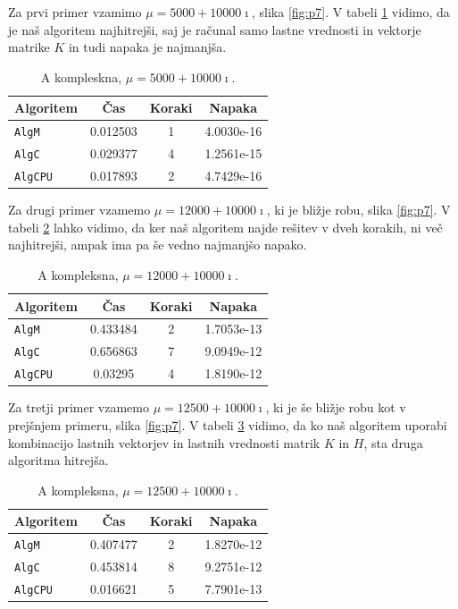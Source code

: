 \documentclass[12pt,a4paper]{amsart}
\theoremstyle{definition}
\theoremstyle{plain}
\begin{document}
Za prvi primer vzamimo $\mu = 5000+10000\imath$, slika \ref{fig:p7}. V tabeli \ref{t7} vidimo, da je naš algoritem najhitrejši, saj je računal samo lastne vrednosti in vektorje matrike $K$ in tudi napaka je najmanjša.


\begin{table}[H]
\caption{A kompleskna, $\mu = 5000+10000\imath$.}
\begin{tabular}{|l|c|c|c|}
\hline
Algoritem & Čas & Koraki & Napaka\\
\hline
\hline
\verb+AlgM+ &0.012503&1&4.0030e-16\\
\hline
\verb+AlgC+ &0.029377&4& 1.2561e-15\\
\hline
\verb+AlgCPU+ &0.017893&2&4.7429e-16\\
\hline
\end{tabular}

\label{t7}
\end{table}

Za drugi primer vzamemo $\mu = 12000+10000\imath$, ki je bližje robu, slika \ref{fig:p7}. V tabeli \ref{t8} lahko vidimo, da ker naš algoritem najde rešitev v dveh korakih, ni več najhitrejši, ampak ima pa še vedno najmanjšo napako.

\begin{table}[H]
\caption{A kompleksna, $\mu = 12000+10000\imath$.}
\begin{tabular}{|l|c|c|c|}
\hline
Algoritem & Čas & Koraki & Napaka\\
\hline
\hline
\verb+AlgM+& 0.433484&2 &1.7053e-13 \\
\hline
\verb+AlgC+ &0.656863&7&9.0949e-12\\
\hline
\verb+AlgCPU+ &0.03295&4&1.8190e-12\\
\hline
\end{tabular}

\label{t8}
\end{table}

Za tretji primer vzamemo $\mu = 12500+10000\imath$, ki je še bližje robu kot v prejšnjem primeru, slika \ref{fig:p7}. V tabeli \ref{t9} vidimo, da ko naš algoritem uporabi kombinacijo lastnih vektorjev in lastnih vrednosti matrik $K$ in $H$, sta druga algoritma hitrejša.


\begin{table}[H]
\caption{A kompleksna, $\mu = 12500+10000\imath$.}
\begin{tabular}{|l|c|c|c|}
\hline
Algoritem & Čas & Koraki & Napaka\\
\hline
\hline
\verb+AlgM+ &0.407477&2&1.8270e-12\\
\hline
\verb+AlgC+ &0.453814 &8 & 9.2751e-12\\
\hline
\verb+AlgCPU+ &0.016621& 5&7.7901e-13 \\
\hline
\end{tabular}

\label{t9}
\end{table}
\end{document}
